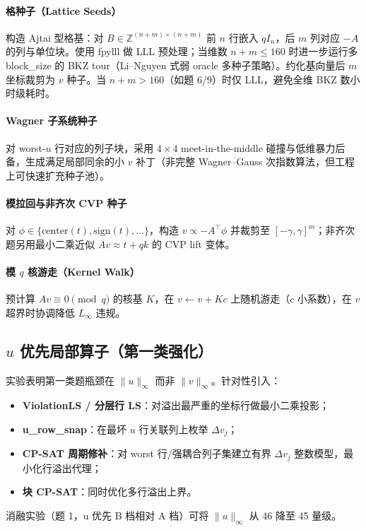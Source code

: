 \documentclass[12pt,a4paper]{ctexart}
\begin{document}
\paragraph{格种子（Lattice Seeds）}
构造 Ajtai 型格基：对 $B\in\mathbb{Z}^{(n+m)\times(n+m)}$ 前 $n$ 行嵌入 $qI_n$，后 $m$ 列对应 $-A$ 的列与单位块。使用 fpylll 做 LLL 预处理；当维数 $n+m\le 160$ 时进一步运行多 block\_size 的 BKZ tour（Li--Nguyen 式弱 oracle 多种子策略）。约化基向量后 $m$ 坐标裁剪为 $v$ 种子。当 $n+m>160$（如题 6/9）时仅 LLL，避免全维 BKZ 数小时级耗时。

\paragraph{Wagner 子系统种子}
对 worst-$u$ 行对应的列子块，采用 $4\times4$  meet-in-the-middle 碰撞与低维暴力后备，生成满足局部同余的小 $v$ 补丁（非完整 Wagner--Gauss 次指数算法，但工程上可快速扩充种子池）。

\paragraph{模拉回与非齐次 CVP 种子}
对 $\phi\in\{\mathrm{center}(t),\mathrm{sign}(t),\ldots\}$，构造 $v\propto -A^\top\phi$ 并裁剪至 $[-\gamma,\gamma]^m$；非齐次题另用最小二乘近似 $Av\approx t+qk$ 的 CVP lift 变体。

\paragraph{模 $q$ 核游走（Kernel Walk）}
预计算 $A v\equiv 0\pmod q$ 的核基 $K$，在 $v\leftarrow v+Kc$ 上随机游走（$c$ 小系数），在 $v$ 超界时协调降低 $L_{\infty}$ 违规。

\subsection{$u$ 优先局部算子（第一类强化）}

实验表明第一类题瓶颈在 $\|u\|_{\infty}$ 而非 $\|v\|_{\infty}$。针对性引入：
\begin{itemize}
  \item \textbf{ViolationLS / 分层行 LS}：对溢出最严重的坐标行做最小二乘投影；
  \item \textbf{u\_row\_snap}：在最坏 $u$ 行关联列上枚举 $\Delta v_j$；
  \item \textbf{CP-SAT 周期修补}：对 worst 行/强耦合列子集建立有界 $\Delta v_j$ 整数模型，最小化行溢出代理；
  \item \textbf{块 CP-SAT}：同时优化多行溢出上界。
\end{itemize}
消融实验（题 1，u 优先 B 档相对 A 档）可将 $\|u\|_{\infty}$ 从 46 降至 45 量级。
\end{document}
